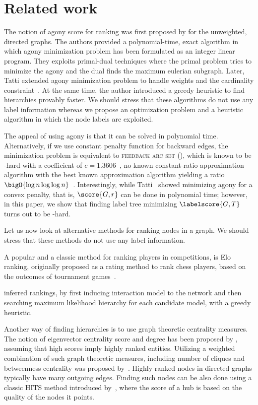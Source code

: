 \section{Related work}
\label{sec:related}

The notion of agony score for  ranking was first proposed by \citet{gupte2011finding} for
the unweighted, directed graphs. The authors provided a
polynomial-time, exact algorithm in which agony minimization problem has been
formulated as an integer linear program. They exploits primal-dual techniques
where the primal problem tries to minimize the agony and  the dual  finds the
maximum eulerian subgraph. Later, Tatti extended agony minimization problem
to handle weights and the cardinality constraint~\cite{nikolaj2017tiers}. At the same time, the author  introduced a
greedy heuristic  to find hierarchies provably  faster.
We should stress that these algorithms do not use any label information whereas
we propose an optimization problem and a heuristic algorithm in which the node
labels are exploited.


The appeal of using agony is that it can be solved in polynomial time.
Alternatively, if we use
constant penalty function for backward edges, the minimization problem is equivalent to \textsc{feedback arc set}
(\fasprb), which is known to be \apx-hard with a coefficient of $c =
1.3606$~\cite{dinur2005hardness}, no known constant-ratio
approximation algorithm with the best known approximation algorithm
yielding a ratio $\bigO{\log n \log \log n}$~\cite{even1998approximating}. Interestingly, while
Tatti~\cite{nikolaj2017tiers} showed
minimizing agony for a convex penalty, that is, $\score{G, r}$ can be done
in polynomial time; however, in this paper, we show that finding label tree
minimizing $\labelscore{G, T}$ turns out to be \np-hard.

Let us now look at alternative methods for ranking nodes in a graph.
We should stress that these methods do not use any label information.

A popular and a classic method for ranking players in competitions, is Elo
ranking, originally proposed as a rating method to rank chess players, based on
the outcomes of tournament games~\cite{elo1978rating}. 

\citet{maiya2009inferring} inferred  rankings, by first inducing interaction
model to the network and then searching maximum likelihood hierarchy  for each
candidate model, with a greedy heuristic.

Another way of finding hierarchies is to use graph theoretic centrality
measures. The notion of  eigenvector centrality score and degree has been
proposed by \citet{memon2008retracted}, assuming that high scores imply  highly
ranked entities. Utilizing a weighted combination of such graph theoretic
measures, including  number of cliques and betweenness  centrality was proposed
by~\citet{rowe2007automated}.
Highly ranked nodes in directed graphs typically have many outgoing edges.
Finding such nodes can be also done using a classic HITS method introduced
by~\citet{kleinberg1999authoritative}, where the score of a hub is based on the quality
of the nodes it points.